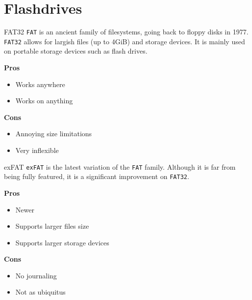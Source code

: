 \documentclass{lug}
\begin{document}
\section{Flashdrives}
\begin{frame}{FAT32}
    \texttt{FAT} is an ancient family of filesystems, going back to floppy disks
    in 1977. \texttt{FAT32} allows for largish files (up to 4GiB) and storage
    devices. It is mainly used on portable storage devices such as flash drives.

    \textbf{Pros}
    \begin{itemize}
        \item Works anywhere
        \item Works on anything
    \end{itemize}

    \textbf{Cons}
    \begin{itemize}
        \item Annoying size limitations
        \item Very inflexible
    \end{itemize}
\end{frame}

\begin{frame}{exFAT}
    \texttt{exFAT} is the latest variation of the \texttt{FAT} family. Although
    it is far from being fully featured, it is a significant improvement on
    \texttt{FAT32}.

    \textbf{Pros}
    \begin{itemize}
        \item Newer
        \item Supports larger files size
        \item Supports larger storage devices
    \end{itemize}

    \textbf{Cons}
    \begin{itemize}
        \item No journaling
        \item Not as ubiquitus
    \end{itemize}
\end{frame}
\end{document}
